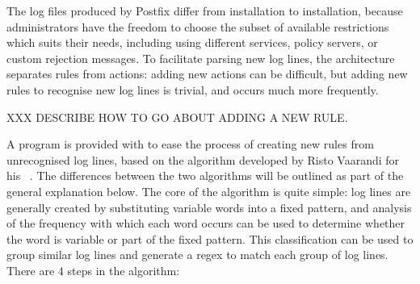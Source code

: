 \label{creating new rules in implementation}

The log files produced by Postfix differ from installation to installation,
because administrators have the freedom to choose the subset of available
restrictions which suits their needs, including using different
 services, policy servers, or custom rejection messages.  To
facilitate parsing new log lines, the architecture separates rules from
actions: adding new actions can be difficult, but adding new rules to
recognise new log lines is trivial, and occurs much more frequently.

XXX DESCRIBE HOW TO GO ABOUT ADDING A NEW RULE\@.


A program is provided with \parsername{} to ease the process of creating
new rules from unrecognised log lines, based on the algorithm developed by
Risto Vaarandi for his ~\cite{slct-paper}.  The differences
between the two algorithms will be outlined as part of the general
explanation below.  The core of the  algorithm is quite
simple: log lines are generally created by substituting variable words into
a fixed pattern, and analysis of the frequency with which each word occurs
can be used to determine whether the word is variable or part of the fixed
pattern.  This classification can be used to group similar log lines and
generate a regex to match each group of log lines.  There are 4 steps in
the algorithm:

